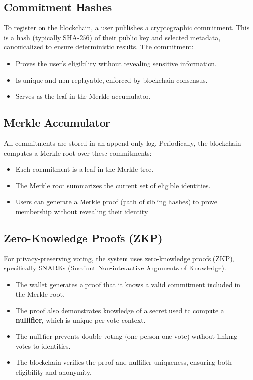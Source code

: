 \documentclass[12pt,a4paper]{report}
\begin{document}
\subsection{Commitment Hashes}
To register on the blockchain, a user publishes a cryptographic commitment. This is a hash (typically SHA-256) of their public key and selected metadata, canonicalized to ensure deterministic results. The commitment:
\begin{itemize}
  \item Proves the user's eligibility without revealing sensitive information.
  \item Is unique and non-replayable, enforced by blockchain consensus.
  \item Serves as the leaf in the Merkle accumulator.
\end{itemize}

\subsection{Merkle Accumulator}
All commitments are stored in an append-only log. Periodically, the blockchain computes a Merkle root over these commitments:
\begin{itemize}
  \item Each commitment is a leaf in the Merkle tree.
  \item The Merkle root summarizes the current set of eligible identities.
  \item Users can generate a Merkle proof (path of sibling hashes) to prove membership without revealing their identity.
\end{itemize}

\subsection{Zero-Knowledge Proofs (ZKP)}
For privacy-preserving voting, the system uses zero-knowledge proofs (ZKP), specifically SNARKs (Succinct Non-interactive Arguments of Knowledge):
\begin{itemize}
  \item The wallet generates a proof that it knows a valid commitment included in the Merkle root.
  \item The proof also demonstrates knowledge of a secret used to compute a \textbf{nullifier}, which is unique per vote context.
  \item The nullifier prevents double voting (one-person-one-vote) without linking votes to identities.
  \item The blockchain verifies the proof and nullifier uniqueness, ensuring both eligibility and anonymity.
\end{itemize}
\end{document}
